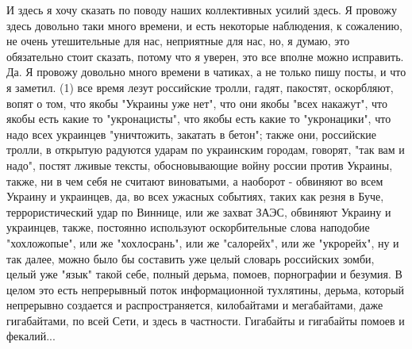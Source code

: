И здесь я хочу сказать по поводу наших коллективных усилий здесь. Я провожу
здесь довольно таки много времени, и есть некоторые наблюдения, к сожалению, не
очень утешительные для нас, неприятные для нас, но, я думаю, это обязательно
стоит сказать, потому что я уверен, это все вполне можно исправить. Да. Я
провожу довольно много времени в чатиках, а не только пишу посты, и что я
заметил. (1) все время лезут российские тролли, гадят, пакостят, оскорбляют,
вопят о том, что якобы "Украины уже нет", что они якобы "всех накажут", что
якобы есть какие то "укронацисты", что якобы есть какие то "укронацики", что
надо всех украинцев "уничтожить, закатать в бетон"; также они, российские
тролли, в открытую радуются ударам по украинским городам, говорят, "так вам и
надо", постят лживые тексты, обосновывающие войну россии против Украины, также,
ни в чем себя не считают виноватыми, а наоборот - обвиняют во всем Украину и
украинцев, да, во всех ужасных событиях, таких как резня в Буче,
террористический удар по Виннице, или же захват ЗАЭС, обвиняют Украину и
украинцев, также, постоянно используют оскорбительные слова наподобие
"хохложопые", или же "хохлосрань", или же "салорейх", или же "укрорейх", ну и
так далее, можно было бы составить уже целый словарь российских зомби, целый
уже "язык" такой себе, полный дерьма, помоев, порнографии и безумия. В целом
это есть непрерывный поток информационной тухлятины, дерьма, который непрерывно
создается и распространяется, килобайтами и мегабайтами, даже гигабайтами, по
всей Сети, и здесь в частности. Гигабайты и гигабайты помоев и фекалий...



